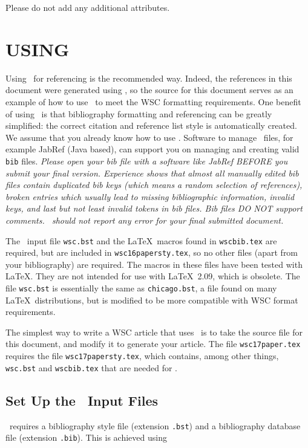 \documentclass{wscpaperproc}
\theoremstyle{wsc}
\begin{document}
Please do not add any additional attributes.

\section{USING \BibTeX}
\label{sec:bibtex}
Using \BibTeX\ for referencing is the recommended way. Indeed, the references in this document were generated using \BibTeX, so the source for this
document serves as an example of how to use \BibTeX\ to meet the WSC formatting requirements.
One benefit of using \BibTeX\ is that bibliography formatting and referencing can be greatly simplified: the correct citation and reference list style is automatically created.
We assume that you already know how to use \BibTeX.
Software to manage \BibTeX\ files, for example JabRef (Java based), can support you on managing and creating valid {\tt bib} files.
{\em Please open your bib file with a software like JabRef BEFORE you submit your final version. Experience shows that almost all manually edited bib files contain duplicated bib keys (which means a random selection of references), broken entries which usually lead to missing bibliographic information, invalid keys, and last but not least invalid tokens in bib files. Bib files DO NOT support comments. \BibTeX\ should not report any error for your final submitted document.}

The \BibTeX\ input file {\tt wsc.bst} and the \LaTeX\ macros found in {\tt wscbib.tex} are required, but are included in {\tt wsc16papersty.tex}, so no other files (apart from your bibliography) are required.
The macros in these files have been tested with \LaTeX. They are not intended for use with \LaTeX\ 2.09, which is obsolete.
The file {\tt wsc.bst} is essentially the same as {\tt chicago.bst}, a file found on many \LaTeX\ distributions, but is
modified to be more compatible with WSC format requirements.

The simplest way to write a WSC article that uses \BibTeX\ is to take the source file for this document, and modify it to generate your article. The file {\tt wsc17paper.tex} requires the file {\tt wsc17papersty.tex}, which contains, among other things, {\tt wsc.bst} and {\tt wscbib.tex} that are needed for \BibTeX.

\subsection{Set Up the \BibTeX\ Input Files}

\BibTeX\ requires a bibliography style file (extension \texttt{.bst}) and a bibliography database file (extension \texttt{.bib}).  This is achieved
using\newline
\end{document}

